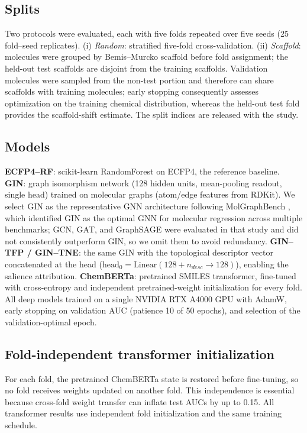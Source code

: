 \documentclass[11pt,a4paper]{article}
\begin{document}
\subsection{Splits}

Two protocols were evaluated, each with five folds repeated over five seeds (\num{25} fold--seed replicates). (i) \emph{Random}: stratified five-fold cross-validation. (ii) \emph{Scaffold}: molecules were grouped by Bemis--Murcko scaffold before fold assignment; the held-out test scaffolds are disjoint from the training scaffolds. Validation molecules were sampled from the non-test portion and therefore can share scaffolds with training molecules; early stopping consequently assesses optimization on the training chemical distribution, whereas the held-out test fold provides the scaffold-shift estimate. The split indices are released with the study.

\subsection{Models}

\textbf{ECFP4--RF}: scikit-learn RandomForest on ECFP4, the reference baseline. \textbf{GIN}: graph isomorphism network (\num{128} hidden units, mean-pooling readout, single head) trained on molecular graphs (atom/edge features from RDKit). We select GIN as the representative GNN architecture following MolGraphBench \citep{guo_ding_2026}, which identified GIN as the optimal GNN for molecular regression across multiple benchmarks; GCN, GAT, and GraphSAGE were evaluated in that study and did not consistently outperform GIN, so we omit them to avoid redundancy. \textbf{GIN--TFP / GIN--TNE}: the same GIN with the topological descriptor vector concatenated at the head ($\mathrm{head}_0 = \mathrm{Linear}(\num{128} + n_{desc} \to \num{128})$), enabling the salience attribution. \textbf{ChemBERTa}: pretrained SMILES transformer, fine-tuned with cross-entropy and independent pretrained-weight initialization for every fold. All deep models trained on a single NVIDIA RTX A4000 GPU with AdamW, early stopping on validation AUC (patience \num{10} of \num{50} epochs), and selection of the validation-optimal epoch.

\subsection{Fold-independent transformer initialization}

For each fold, the pretrained ChemBERTa state is restored before fine-tuning, so no fold receives weights updated on another fold. This independence is essential because cross-fold weight transfer can inflate test AUCs by up to \num{0.15}. All transformer results use independent fold initialization and the same training schedule.
\end{document}
